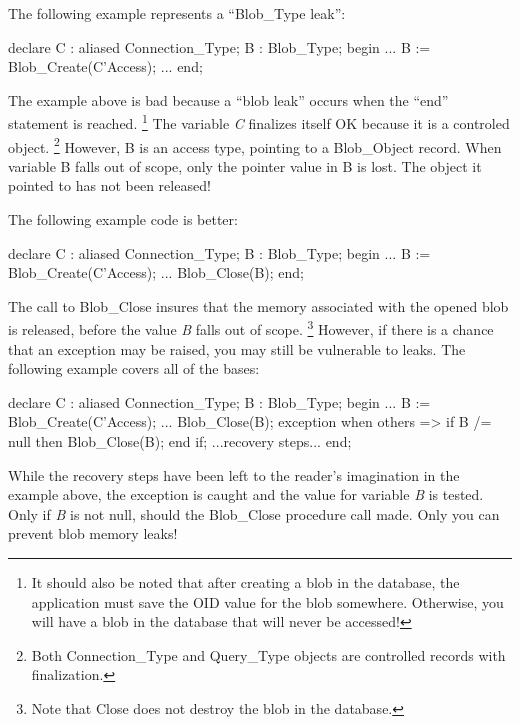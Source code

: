 \documentclass[english,letterpaper]{book}
\begin{document}
The following example represents a ``Blob\_Type leak'':

\begin{Example}
declare
   C :   aliased Connection_Type;
   B :   Blob_Type;
begin
   ...
   B := Blob_Create(C'Access);
   ...
end;
\end{Example}

The example above is bad because a ``blob leak''
occurs when the ``end'' statement is reached.%
\footnote{It should also be noted that after creating a blob in the database,
the application must save the OID value for the blob somewhere. Otherwise,
you will have a blob in the database that will never be accessed!%
} The variable \emph{C} finalizes itself OK because it is a controled
object.%
\footnote{Both Connection\_Type and Query\_Type objects are controlled records
with finalization.%
} However, B is an access type, pointing to a Blob\_Object record.
When variable B falls out of scope, only the pointer value
in B is lost. The object it pointed to has not been released!

The following example code is better:

\begin{Example}
declare
   C :   aliased Connection_Type;
   B :   Blob_Type;
begin
   ...
   B := Blob_Create(C'Access);
   ...
   Blob_Close(B);
end;
\end{Example}

The call to Blob\_Close insures that the memory associated with the
opened blob is released, before the value \emph{B} falls out of scope.%
\footnote{Note that Close does not destroy the blob in the database.%
} However, if there is a chance that an exception may be raised, you
may still be vulnerable to leaks. The following example covers all
of the bases:

\begin{Example}
declare
   C :   aliased Connection_Type;
   B :   Blob_Type;
begin
   ...
   B := Blob_Create(C'Access);
   ...
   Blob_Close(B);
exception
   when others =>
      if B /= null then
         Blob_Close(B);
      end if;
      ...recovery steps...
end;
\end{Example}

While the recovery steps have been left to the reader's imagination
in the example above, the exception is caught and the value for variable
\emph{B} is tested. Only if \emph{B} is not null, should the Blob\_Close
procedure call made. Only you can prevent blob memory leaks!
\end{document}
